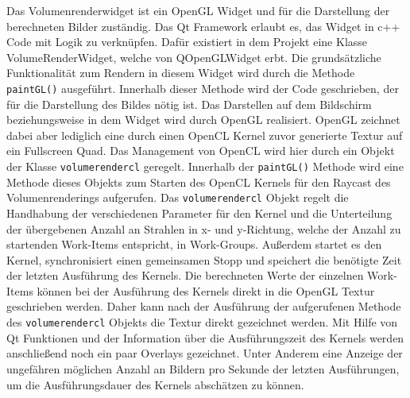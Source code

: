 Das Volumenrenderwidget ist ein OpenGL Widget und für die Darstellung der berechneten Bilder zuständig.
Das Qt Framework erlaubt es, das Widget in c++ Code mit Logik zu verknüpfen.
Dafür existiert in dem Projekt eine Klasse VolumeRenderWidget, welche von QOpenGLWidget erbt.
Die grundsätzliche Funktionalität zum Rendern in diesem Widget wird durch die Methode \texttt{paintGL()} ausgeführt.
Innerhalb dieser Methode wird der Code geschrieben, der für die Darstellung des Bildes nötig ist.
Das Darstellen auf dem Bildschirm beziehungsweise in dem Widget wird durch OpenGL realisiert.
OpenGL zeichnet dabei aber lediglich eine durch einen OpenCL Kernel zuvor generierte Textur auf ein Fullscreen Quad.
Das Management von OpenCL wird hier durch ein Objekt der Klasse \texttt{volumerendercl} geregelt.
Innerhalb der \texttt{paintGL()} Methode wird eine Methode dieses Objekts zum Starten des OpenCL Kernels für den Raycast des Volumenrenderings aufgerufen.
Das \texttt{volumerendercl} Objekt regelt die Handhabung der verschiedenen Parameter für den Kernel und die Unterteilung der übergebenen Anzahl an Strahlen in x- und y-Richtung, welche der Anzahl zu startenden Work-Items entspricht, in Work-Groups.
Außerdem startet es den Kernel, synchronisiert einen gemeinsamen Stopp und speichert die benötigte Zeit der letzten Ausführung des Kernels.
Die berechneten Werte der einzelnen Work-Items können bei der Ausführung des Kernels direkt in die OpenGL Textur geschrieben werden.
Daher kann nach der Ausführung der aufgerufenen Methode des \texttt{volumerendercl} Objekts die Textur direkt gezeichnet werden.
Mit Hilfe von Qt Funktionen und der Information über die Ausführungszeit des Kernels werden anschließend noch ein paar Overlays gezeichnet.
Unter Anderem eine Anzeige der ungefähren möglichen Anzahl an Bildern pro Sekunde der letzten Ausführungen, um die Ausführungsdauer des Kernels abschätzen zu können.

